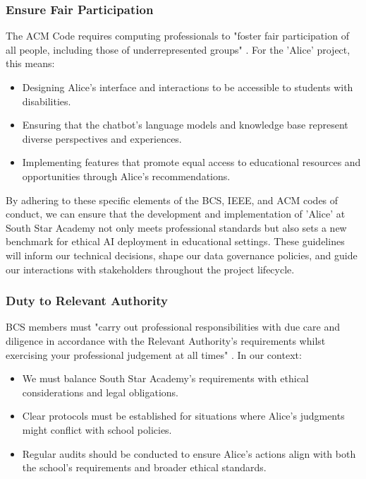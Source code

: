 \documentclass[15pt,a4paper]{article}
\begin{document}
\begin{multicols}{2}
\subsubsection*{Ensure Fair Participation}
The ACM Code requires computing professionals to "foster fair participation of all people, including those of underrepresented groups" \textit{\parencite[p. 2]{ACM2023}}. For the 'Alice' project, this means:

\begin{itemize}
    \item Designing Alice's interface and interactions to be accessible to students with disabilities.
    \item Ensuring that the chatbot's language models and knowledge base represent diverse perspectives and experiences.
    \item Implementing features that promote equal access to educational resources and opportunities through Alice's recommendations.
\end{itemize}

By adhering to these specific elements of the BCS, IEEE, and ACM codes of conduct, we can ensure that the development and implementation of 'Alice' at South Star Academy not only meets professional standards but also sets a new benchmark for ethical AI deployment in educational settings. These guidelines will inform our technical decisions, shape our data governance policies, and guide our interactions with stakeholders throughout the project lifecycle.

\subsubsection*{Duty to Relevant Authority}
BCS members must "carry out professional responsibilities with due care and diligence in accordance with the Relevant Authority's requirements whilst exercising your professional judgement at all times" \textit{\parencite[p. 2]{BCS2024}}. In our context:

\begin{itemize}
    \item We must balance South Star Academy's requirements with ethical considerations and legal obligations.
    \item Clear protocols must be established for situations where Alice's judgments might conflict with school policies.
    \item Regular audits should be conducted to ensure Alice's actions align with both the school's requirements and broader ethical standards.
\end{itemize}


\end{multicols}
\end{document}
